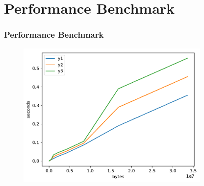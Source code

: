 \section{Performance Benchmark}

\begin{frame}
\frametitle{Performance Benchmark}
	\begin{figure}
		\centering
		\includegraphics[width=0.85\textwidth]{fig.pdf}
	\end{figure}
\end{frame}
